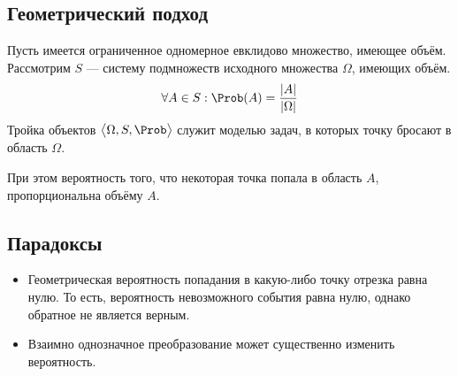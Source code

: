 \subsection{Геометрический подход}
Пусть имеется ограниченное одномерное евклидово множество, имеющее объём. \\
Рассмотрим $S$ --- систему подмножеств исходного множества $\Omega$, имеющих объём.
\[
  \forall A \in S:  \Prob(A) = \frac{|A|}{|\Omega|}
\]
Тройка объектов $ \big<\Omega, S, \Prob\big> $ служит моделью задач, в которых точку бросают в область $\Omega$.
\smallskip

При этом вероятность того, что некоторая точка попала в область $A$, пропорциональна объёму $A$.
\subsection{Парадоксы}
\begin{itemize}
  \item Геометрическая вероятность попадания в какую-либо точку отрезка равна нулю.
  То есть, вероятность невозможного события равна нулю, однако обратное не является верным.
  \item Взаимно однозначное преобразование может существенно изменить вероятность.
\end{itemize}
